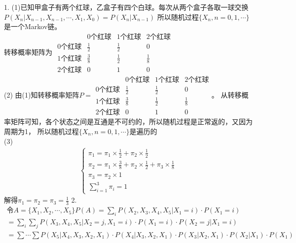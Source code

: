 \documentclass{article}
\begin{document}
    1.
    (1)已知甲盒子有两个红球，乙盒子有四个白球。每次从两个盒子各取一球交换\\
    $P(X_n|X_{n-1}, X_{n-1}, \cdots, X_1, X_0) = P(X_n|X_{n-1})$
    所以随机过程$\{X_n,n=0,1,\cdots\}$是一个Markov链。\\
    转移概率矩阵为
    $\begin{matrix}
                    & 0个红球 & 1个红球 & 2个红球 \\
            0个红球  & \frac{1}{2} & \frac{1}{2} & 0\\
            1个红球  & \frac{3}{8} & \frac{1}{2}  & \frac{1}{8} \\
            2个红球  & 0  &  1  & 0
    \end{matrix}$\\
    (2) 由(1)知转移概率矩阵$
    P = \begin{matrix}
            & 0个红球 & 1个红球 & 2个红球 \\
            0个红球  & \frac{1}{2} & \frac{1}{2} & 0\\
            1个红球  & \frac{3}{8} & \frac{1}{2}  & \frac{1}{8} \\
            2个红球  & 0  &  1  & 0
        \end{matrix}$。
    从转移概率矩阵可知，各个状态之间是互通是不可约的，所以随机过程是正常返的，又因为周期为1，
    所以随机过程$\{X_n, n=0,1, \cdots\}$是遍历的\\
    (3)
    \begin{gather*}
        \begin{cases}
            \pi_1 = \pi_1 \times \frac{1}{2} + \pi_2 \times \frac{1}{2}\\
            \pi_2 = \pi_1 \times \frac{3}{8} + \pi_2 \times \frac{1}{2} + \pi_3 \times \frac{1}{8}\\
            \pi_3 = \pi_2 \times 1\\
            \sum_{i=1}^{3} \pi_i = 1
        \end{cases}
    \end{gather*}  
    解得$\pi_1 = \pi_2 = \pi_3 = \frac{1}{3}$
    2.
    \begin{gather*}
        \text{令$A = \{ X_1, X_2,\cdots, X_5\}$} 
        P(A) = \sum_i P(X_2, X_3, X_4, X_5| X_1 = i) \cdot P(X_1 = i)\\   
        = \sum_i \sum_j P(X_3, X_4, X_5| X_2=j, X_1 = i) \cdot P(X_1 =i) \cdot P(X_2=j|X_1=i)\\
        = \sum \cdots \sum P(X_5|X_4, X_3, X_2, X_1) \cdot P(X_4|X_3, X_2, X_1) \cdot P(X_3|X_2,X_1) \cdot P(X_2|X_1) \cdot P(X_1)
    \end{gather*}
\end{document}

